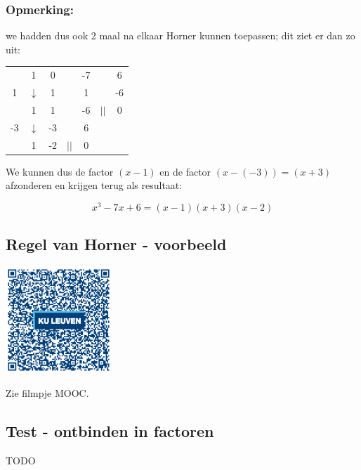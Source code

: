 \begin{voorbeeld}
\subsubsection{Opmerking:} we hadden dus ook 2 maal na elkaar Horner kunnen toepassen; dit ziet er dan zo uit:


\begin{center}
	\begin{tabular}{c|cccccc}
		& 1 & 0 & &-7 & & 6 \\
		1 & $\downarrow$ & 1 & & 1 & & -6\\
		\hline 
		& 1 & 1 & & -6 & $||$ & 0 \\
		-3 & $\downarrow$ & -3 & & 6 & &\\
		\hline
		& 1 & -2 & $||$ & 0 &
	\end{tabular}
\end{center}


We kunnen dus de factor $(x-1)$ en de factor $(x-(-3))=(x+3)$ afzonderen en krijgen terug als resultaat:

\begin{equation*}
x^3-7x+6=(x-1)(x+3)(x-2)
\end{equation*}
\end{voorbeeld}

\subsection{Regel van Horner - voorbeeld}
\begin{minipage}{.25\linewidth}
	\raggedright
	\includegraphics[width=4cm]{1_elem_rekenvaardigheden_A/inputs/QR_Code_HORNER_module1new}
\end{minipage}
\begin{minipage}{.7\linewidth}
	Zie filmpje MOOC.
\end{minipage}

\subsection{Test - ontbinden in factoren}
TODO